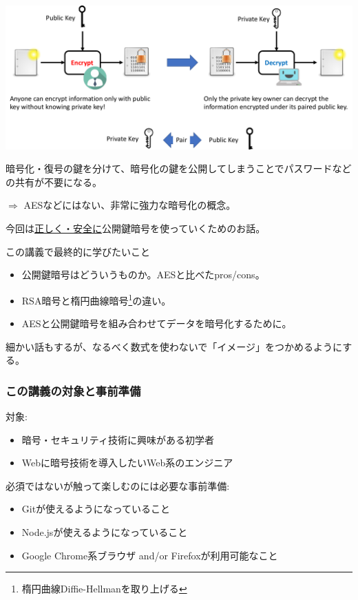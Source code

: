 \documentclass[12pt,dvipdfmx]{beamer}
\begin{document}
\begin{frame}
\begin{center}
\includegraphics[width=\linewidth]{Figs/pk_cryptosystem.pdf}
\end{center}

暗号化・復号の鍵を分けて、暗号化の鍵を公開してしまうことで\alert{パスワードなどの共有が不要}になる。

\vspace{1ex}

$\Rightarrow$ AESなどにはない、非常に強力な暗号化の概念。
\end{frame}

\begin{frame}
今回は\underline{正しく・安全に}公開鍵暗号を使っていくためのお話。

\begin{block}{\small この講義で最終的に学びたいこと}
\begin{itemize}
\item 公開鍵暗号はどういうものか。AESと比べたpros/cons。
\item RSA暗号と楕円曲線暗号\footnote[frame]{楕円曲線Diffie-Hellmanを取り上げる}の違い。
\item AESと公開鍵暗号を組み合わせてデータを暗号化するために。
\end{itemize}
\end{block}

細かい話もするが、なるべく数式を使わないで「イメージ」をつかめるようにする。
\end{frame}


\begin{frame}
\frametitle{この講義の対象と事前準備}
対象:
\begin{itemize}
\item 暗号・セキュリティ技術に興味がある初学者
\item Webに暗号技術を導入したいWeb系のエンジニア
\end{itemize}

\vspace{2ex}

必須ではないが触って楽しむのには必要な事前準備:
\begin{itemize}
\item Gitが使えるようになっていること
\item Node.jsが使えるようになっていること
\item Google Chrome系ブラウザ and/or Firefoxが利用可能なこと
\end{itemize}
\end{frame}
\end{document}
